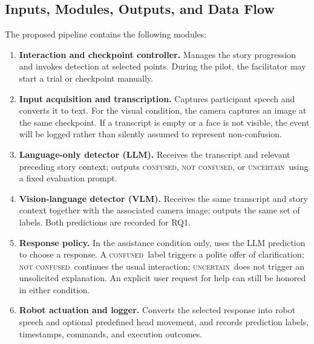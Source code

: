 \documentclass[conference]{IEEEtran}
\newcommand{\confused}{\textsc{confused}}
\newcommand{\notconfused}{\textsc{not confused}}
\newcommand{\uncertain}{\textsc{uncertain}}
\begin{document}
\subsection{Inputs, Modules, Outputs, and Data Flow}
The proposed pipeline contains the following modules:
\begin{enumerate}
\item \textbf{Interaction and checkpoint controller.} Manages the story progression and invokes detection at selected points. During the pilot, the facilitator may start a trial or checkpoint manually.
\item \textbf{Input acquisition and transcription.} Captures participant speech and converts it to text. For the visual condition, the camera captures an image at the same checkpoint. If a transcript is empty or a face is not visible, the event will be logged rather than silently assumed to represent non-confusion.
\item \textbf{Language-only detector (LLM).} Receives the transcript and relevant preceding story context; outputs \confused, \notconfused, or \uncertain\ using a fixed evaluation prompt.
\item \textbf{Vision-language detector (VLM).} Receives the same transcript and story context together with the associated camera image; outputs the same set of labels. Both predictions are recorded for RQ1.
\item \textbf{Response policy.} In the assistance condition only, uses the LLM prediction to choose a response. A \confused\ label triggers a polite offer of clarification; \notconfused\ continues the usual interaction; \uncertain\ does not trigger an unsolicited explanation. An explicit user request for help can still be honored in either condition.
\item \textbf{Robot actuation and logger.} Converts the selected response into robot speech and optional predefined head movement, and records prediction labels, timestamps, commands, and execution outcomes.
\end{enumerate}
\end{document}

